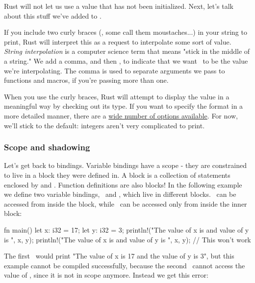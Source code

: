 Rust will not let us use a value that has not been initialized. Next, let's talk about this stuff we've added to \println.

\blank

If you include two curly braces (\code{\{\}}, some call them moustaches...) in your string to print, Rust will interpret this as 
a request to interpolate some sort of value. \emph{String interpolation} is a computer science term that means "stick in the middle
of a string." We add a comma, and then \x, to indicate that we want \x\ to be the value we're interpolating. The comma 
is used to separate arguments we pass to functions and macros, if you're passing more than one.

\blank

When you use the curly braces, Rust will attempt to display the value in a meaningful way by checking out its type. If you want 
to specify the format in a more detailed manner, there are a \href{https://doc.rust-lang.org/std/fmt/}{wide number of options
available}. For now, we'll stick to the default: integers aren't very complicated to print.

\subsubsection*{Scope and shadowing}

Let's get back to bindings. Variable bindings have a scope - they are constrained to live in a block they were defined in. A block 
is a collection of statements enclosed by \code{\{} and \code{\}}. Function definitions are also blocks! In the following example 
we define two variable bindings, \x\ and \y, which live in different blocks. \x\ can be accessed from inside the 
 block, while \y\ can be accessed only from inside the inner block:

\begin{rustc}
fn main() {
    let x: i32 = 17;
    {
        let y: i32 = 3;
        println!("The value of x is {} and value of y is {}", x, y);
    }
    println!("The value of x is {} and value of y is {}", x, y); // This won't work
}
\end{rustc}

The first \println\ would print "The value of x is 17 and the value of y is 3", but this example cannot be compiled
successfully, because the second \println\ cannot access the value of \y, since it is not in scope anymore. Instead 
we get this error:

